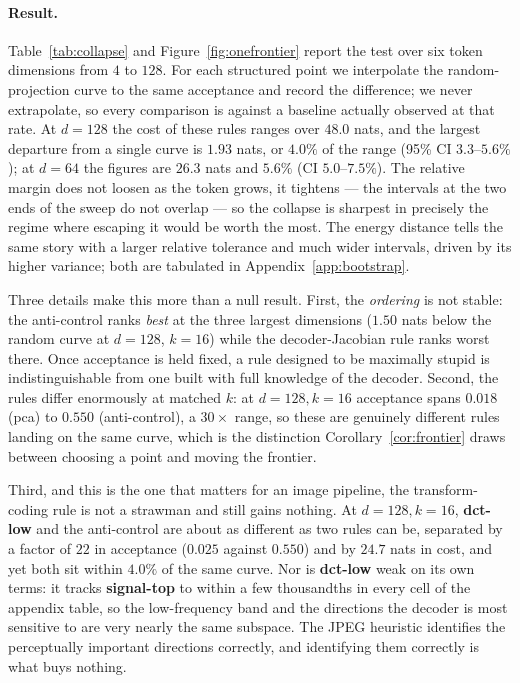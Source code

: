 \documentclass[10pt]{article}
\newcommand{\dd}{d}
\newcommand{\kk}{k}
\newcommand{\best}[1]{\bm{#1}}
\begin{document}
\paragraph{Result.} Table~\ref{tab:collapse} and Figure~\ref{fig:onefrontier} report the test over
six token dimensions from $4$ to $128$. For each structured point we
interpolate the random-projection curve to the same acceptance and record the difference; we never
extrapolate, so every comparison is against a baseline actually observed at that rate. At $\dd = 128$
the cost of these rules ranges over $48.0$ nats, and the largest departure from a single curve is
$1.93$ nats, or $\best{4.0\%}$ of the range (95\% CI $3.3$--$5.6\%$); at $\dd = 64$ the figures are
$26.3$ nats and $5.6\%$ (CI $5.0$--$7.5\%$). The relative margin does not loosen as the token grows,
it tightens --- the intervals at the two ends of the sweep do not overlap --- so the collapse is
sharpest in precisely the regime where escaping it would be worth the most. The energy distance tells
the same story with a larger relative tolerance and much wider intervals, driven by its higher
variance; both are tabulated in Appendix~\ref{app:bootstrap}.

Three details make this more than a null result. First, the \emph{ordering} is not stable: the
anti-control ranks \emph{best} at the three largest dimensions ($1.50$ nats below the random curve at
$\dd{=}128$, $\kk{=}16$) while the decoder-Jacobian rule ranks worst there. Once acceptance is held
fixed, a rule designed to be maximally stupid is indistinguishable from one built with full knowledge
of the decoder. Second, the rules differ enormously at matched $\kk$: at $\dd{=}128,\kk{=}16$
acceptance spans $0.018$ (pca) to $0.550$ (anti-control), a $30\times$ range, so these are genuinely
different rules landing on the same curve, which is the distinction
Corollary~\ref{cor:frontier} draws between choosing a point and moving the frontier.

Third, and this is the one that matters for an image pipeline, the transform-coding rule is not a
strawman and still gains nothing. At $\dd{=}128, \kk{=}16$, \textbf{dct-low} and the anti-control are
about as different as two rules can be, separated by a factor of $22$ in acceptance ($0.025$ against
$0.550$) and by $24.7$ nats in cost, and yet both sit within $4.0\%$ of the same curve. Nor is
\textbf{dct-low} weak on its own terms: it tracks \textbf{signal-top} to within a few thousandths in
every cell of the appendix table, so the low-frequency band and the directions the decoder is most
sensitive to are very nearly the same subspace. The JPEG heuristic identifies the perceptually
important directions correctly, and identifying them correctly is what buys nothing.
\end{document}
